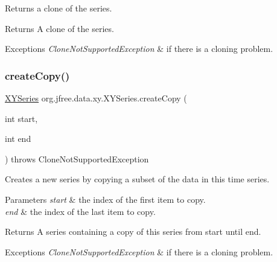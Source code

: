 Returns a clone of the series.

\begin{DoxyReturn}{Returns}
A clone of the series.
\end{DoxyReturn}

\begin{DoxyExceptions}{Exceptions}
{\em Clone\+Not\+Supported\+Exception} & if there is a cloning problem. \\
\hline
\end{DoxyExceptions}
\mbox{\label{classorg_1_1jfree_1_1data_1_1xy_1_1_x_y_series_ab8fe2ad31f64c4db93a7fcd55f7d3bca}} 
\subsubsection{\texorpdfstring{create\+Copy()}{createCopy()}}
{\footnotesize\ttfamily \mbox{\hyperlink{classorg_1_1jfree_1_1data_1_1xy_1_1_x_y_series}{X\+Y\+Series}} org.\+jfree.\+data.\+xy.\+X\+Y\+Series.\+create\+Copy (\begin{DoxyParamCaption}\item[{int}]{start,  }\item[{int}]{end }\end{DoxyParamCaption}) throws Clone\+Not\+Supported\+Exception}

Creates a new series by copying a subset of the data in this time series.


\begin{DoxyParams}{Parameters}
{\em start} & the index of the first item to copy. \\
\hline
{\em end} & the index of the last item to copy.\\
\hline
\end{DoxyParams}
\begin{DoxyReturn}{Returns}
A series containing a copy of this series from start until end.
\end{DoxyReturn}

\begin{DoxyExceptions}{Exceptions}
{\em Clone\+Not\+Supported\+Exception} & if there is a cloning problem. \\
\hline
\end{DoxyExceptions}
\mbox{\label{classorg_1_1jfree_1_1data_1_1xy_1_1_x_y_series_ae1b054aa1ce3e818f0621364a46f1bd8}} 
